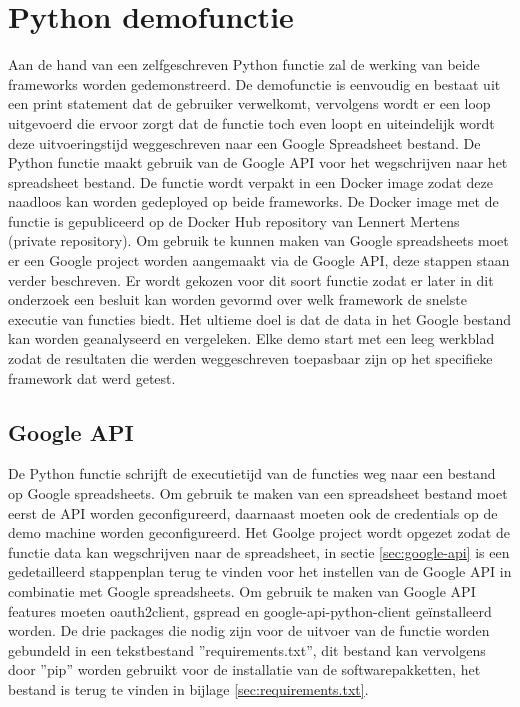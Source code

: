 \section{Python demofunctie}
\label{sec:python-demofunctie}
Aan de hand van een zelfgeschreven Python functie zal de werking van beide frameworks worden gedemonstreerd. De demofunctie is eenvoudig en bestaat uit een print statement dat de gebruiker verwelkomt, vervolgens wordt er een loop uitgevoerd die ervoor zorgt dat de functie toch even loopt en uiteindelijk wordt deze uitvoeringstijd weggeschreven naar een Google Spreadsheet bestand. De Python functie maakt gebruik van de Google API voor het wegschrijven naar het spreadsheet bestand. De functie wordt verpakt in een Docker image zodat deze naadloos kan worden gedeployed op beide frameworks. De Docker image met de functie is gepubliceerd op de Docker Hub repository van Lennert Mertens (private repository). Om gebruik te kunnen maken van Google spreadsheets moet er een Google project worden aangemaakt via de Google API, deze stappen staan verder beschreven. Er wordt gekozen voor dit soort functie zodat er later in dit onderzoek een besluit kan worden gevormd over welk framework de snelste executie van functies biedt. Het ultieme doel is dat de data in het Google bestand kan worden geanalyseerd en vergeleken. Elke demo start met een leeg werkblad zodat de resultaten die werden weggeschreven toepasbaar zijn op het specifieke framework dat werd getest.

\subsection{Google API}
De Python functie schrijft de executietijd van de functies weg naar een bestand op Google spreadsheets. Om gebruik te maken van een spreadsheet bestand moet eerst de API worden geconfigureerd, daarnaast moeten ook de credentials op de demo machine worden geconfigureerd. Het Goolge project wordt opgezet zodat de functie data kan wegschrijven naar de spreadsheet, in sectie \ref{sec:google-api} is een gedetailleerd stappenplan terug te vinden voor het instellen van de Google API in combinatie met Google spreadsheets. Om gebruik te maken van Google API features moeten oauth2client, gspread en google-api-python-client geïnstalleerd worden. De drie packages die nodig zijn voor de uitvoer van de functie worden gebundeld in een tekstbestand ''requirements.txt'', dit bestand kan vervolgens door ''pip'' worden gebruikt voor de installatie van de softwarepakketten, het bestand is terug te vinden in bijlage \ref{sec:requirements.txt}.


